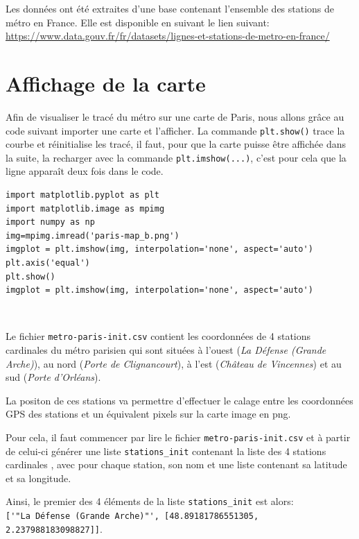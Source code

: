 Les données ont été extraites d'une base contenant l'ensemble des stations de métro en France. Elle est disponible en suivant le lien suivant:\\
\href{https://www.data.gouv.fr/fr/datasets/lignes-et-stations-de-metro-en-france/}{https://www.data.gouv.fr/fr/datasets/lignes-et-stations-de-metro-en-france/}

\section{Affichage de la carte}

Afin de visualiser le tracé du métro sur une carte de Paris, nous allons grâce au code suivant importer une carte et l'afficher. La commande \verb?plt.show()? trace la courbe et réinitialise les tracé, il faut, pour que la carte puisse être affichée dans la suite, la recharger avec la commande \verb?plt.imshow(...)?, c'est pour cela que la ligne apparaît deux fois dans le code.

\begin{verbatim}
import matplotlib.pyplot as plt
import matplotlib.image as mpimg
import numpy as np
img=mpimg.imread('paris-map_b.png')
imgplot = plt.imshow(img, interpolation='none', aspect='auto')
plt.axis('equal')
plt.show()
imgplot = plt.imshow(img, interpolation='none', aspect='auto')
\end{verbatim}


~\

Le fichier \verb?metro-paris-init.csv? contient les coordonnées de 4 stations \og cardinales \fg du métro parisien qui sont situées à l'ouest (\textit{La Défense (Grande Arche)}), au nord (\textit{Porte de Clignancourt}), à l'est (\textit{Château de Vincennes}) et au sud (\textit{Porte d'Orléans}).

La positon de ces stations va permettre d'effectuer le calage entre les coordonnées GPS des stations et un équivalent pixels sur la carte image en png.

Pour cela, il faut commencer par lire le fichier \verb?metro-paris-init.csv? et à partir de celui-ci générer une liste \verb?stations_init? contenant la liste des 4 stations \og cardinales \fg, avec pour chaque station, son nom et une liste contenant sa latitude et sa longitude.

Ainsi, le premier des 4 éléments de la liste \verb?stations_init? est alors:\\
\verb?['"La Défense (Grande Arche)"', [48.89181786551305, 2.237988183098827]]?.

